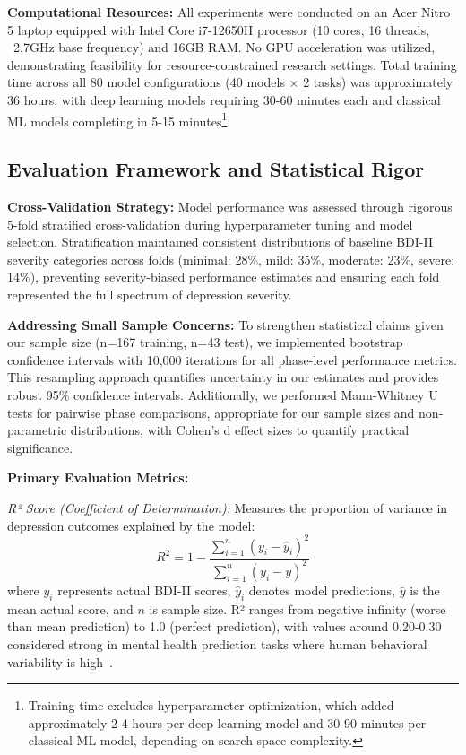 \documentclass[conference]{IEEEtran}
\begin{document}
\textbf{Computational Resources:} All experiments were conducted on an Acer Nitro 5 laptop equipped with Intel Core i7-12650H processor (10 cores, 16 threads, ~2.7GHz base frequency) and 16GB RAM. No GPU acceleration was utilized, demonstrating feasibility for resource-constrained research settings. Total training time across all 80 model configurations (40 models × 2 tasks) was approximately 36 hours, with deep learning models requiring 30-60 minutes each and classical ML models completing in 5-15 minutes\footnote{Training time excludes hyperparameter optimization, which added approximately 2-4 hours per deep learning model and 30-90 minutes per classical ML model, depending on search space complexity.}.

\subsection{Evaluation Framework and Statistical Rigor}

\textbf{Cross-Validation Strategy:} Model performance was assessed through rigorous 5-fold stratified cross-validation during hyperparameter tuning and model selection. Stratification maintained consistent distributions of baseline BDI-II severity categories across folds (minimal: 28\%, mild: 35\%, moderate: 23\%, severe: 14\%), preventing severity-biased performance estimates and ensuring each fold represented the full spectrum of depression severity.

\textbf{Addressing Small Sample Concerns:} To strengthen statistical claims given our sample size (n=167 training, n=43 test), we implemented bootstrap confidence intervals with 10,000 iterations for all phase-level performance metrics. This resampling approach quantifies uncertainty in our estimates and provides robust 95\% confidence intervals. Additionally, we performed Mann-Whitney U tests for pairwise phase comparisons, appropriate for our sample sizes and non-parametric distributions, with Cohen's d effect sizes to quantify practical significance.

\textbf{Primary Evaluation Metrics:}

\textit{R² Score (Coefficient of Determination):} Measures the proportion of variance in depression outcomes explained by the model:
\[
R^2 = 1 - \frac{\sum_{i=1}^{n} (y_i - \hat{y}_i)^2}{\sum_{i=1}^{n} (y_i - \bar{y})^2}
\]
where $y_i$ represents actual BDI-II scores, $\hat{y}_i$ denotes model predictions, $\bar{y}$ is the mean actual score, and $n$ is sample size. R² ranges from negative infinity (worse than mean prediction) to 1.0 (perfect prediction), with values around 0.20-0.30 considered strong in mental health prediction tasks where human behavioral variability is high~\cite{b6,b7,b8}.
\end{document}
